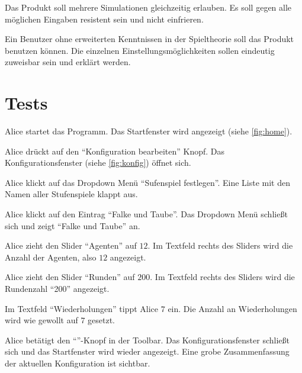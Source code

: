 \documentclass[parskip=full,11pt]{scrartcl}
\begin{document}
Das Produkt soll mehrere Simulationen gleichzeitig erlauben. Es soll gegen alle möglichen Eingaben resistent sein und nicht einfrieren.


Ein Benutzer ohne erweiterten Kenntnissen in der Spieltheorie soll das Produkt benutzen können.
Die einzelnen Einstellungsmöglichkeiten sollen eindeutig zuweisbar sein und erklärt werden.

\section{Tests}


{Alice startet das Programm.}
{Das Startfenster wird angezeigt (siehe \cref{fig:home}).}

{Alice drückt auf den \enquote{Konfiguration bearbeiten} Knopf.}
{Das Konfigurationsfenster (siehe \cref{fig:konfig}) öffnet sich.}

{Alice klickt auf das Dropdown Menü \enquote{Sufenspiel festlegen}.}
{Eine Liste mit den Namen aller Stufenspiele klappt aus.}

{Alice klickt auf den Eintrag \enquote{Falke und Taube}.}
{Das Dropdown Menü schließt sich und zeigt \enquote{Falke und Taube} an.}

{Alice zieht den Slider \enquote{Agenten} auf \(12\).}
{Im Textfeld rechts des Sliders wird die Anzahl der Agenten, also \(12\) angezeigt.}

{Alice zieht den Slider \enquote{Runden} auf \(200\).}%
{Im Textfeld rechts des Sliders wird die Rundenzahl \enquote{200} angezeigt.}

{Im Textfeld \enquote{Wiederholungen} tippt Alice \(7\) ein.}
{Die Anzahl an Wiederholungen wird wie gewollt auf \(7\) gesetzt.}

{Alice betätigt den \enquote{\checkmark}-Knopf in der Toolbar.}
{Das Konfigurationsfenster schließt sich und das Startfenster wird wieder angezeigt. Eine grobe Zusammenfassung der aktuellen Konfiguration ist sichtbar.}
\end{document}
